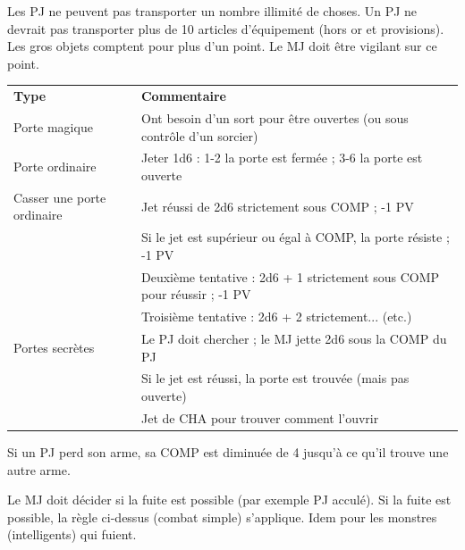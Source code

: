 \begin{frame}[b]
{

Les PJ ne peuvent pas transporter un nombre illimité de choses. Un PJ ne devrait pas transporter plus de 10 articles d'équipement (hors or et provisions). Les gros objets comptent pour plus d'un point. Le MJ doit être vigilant sur ce point.


\vspace{0.2cm}

\begin{tabular}{>{\raggedright}p{1.8cm}p{6.2cm}}
\textbf{Type} & \textbf{Commentaire} \\
Porte magique              & Ont besoin d'un sort pour être ouvertes (ou sous contrôle d'un sorcier) \\
Porte ordinaire            & Jeter 1d6 : 1-2 la porte est fermée ; 3-6 la porte est ouverte          \\
Casser une porte ordinaire & Jet réussi de 2d6 strictement sous COMP ; -1 PV                         \\
                           & Si le jet est supérieur ou égal à COMP, la porte résiste ; -1 PV        \\
                           & Deuxième tentative : 2d6 + 1 strictement sous COMP pour réussir ; -1 PV \\
                           & Troisième tentative : 2d6 + 2 strictement... (etc.)                     \\
Portes secrètes            & Le PJ doit chercher ; le MJ jette 2d6 sous la COMP du PJ                \\
                           & Si le jet est réussi, la porte est trouvée (mais pas ouverte)           \\
                           & Jet de CHA pour trouver comment l'ouvrir                                \\
\end{tabular}

}
{


Si un PJ perd son arme, sa COMP est diminuée de 4 jusqu'à ce qu'il trouve une autre arme.


Le MJ doit décider si la fuite est possible (par exemple PJ acculé). Si la fuite est possible, la règle ci-dessus (combat simple) s'applique. Idem pour les monstres (intelligents) qui fuient.

}
\end{frame}
